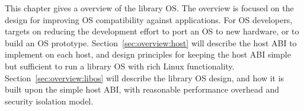 This chapter gives a overview of the \graphene{} library OS.
The overview is focused on the design for improving OS compatibility against applications. For OS developers, \graphene{} targets on reducing the development effort 
to port an OS to new hardware, or to build an OS prototype.
Section~\ref{sec:overview:host} will describe
the host ABI to implement on each host, and design principles for keeping the host ABI simple but sufficient to run a library OS with rich Linux functionality.
Section~\ref{sec:overview:libos} will describe the library OS design, and how it is built upon the simple host ABI, with reasonable performance overhead and security isolation model.
